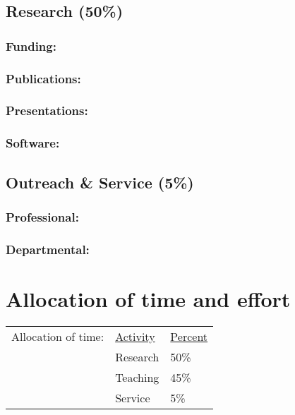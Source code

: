 \subsection{Research (50\%)}

\subsubsection{Funding:}


\subsubsection{Publications:}


\subsubsection{Presentations:}


\subsubsection{Software:}


\subsection{Outreach \& Service (5\%)}

\subsubsection{Professional:}


\subsubsection{Departmental:}


\section{Allocation of time and effort}
\begin{tabular}{ l l l }
    Allocation of time: & \underline{Activity} & \underline{Percent} \\
    & Research & 50\% \\
    & Teaching & 45\% \\
    & Service & 5\% \\
\end{tabular}


